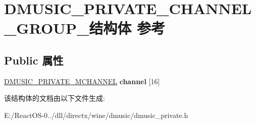 \hypertarget{struct_d_m_u_s_i_c___p_r_i_v_a_t_e___c_h_a_n_n_e_l___g_r_o_u_p__}{}\section{D\+M\+U\+S\+I\+C\+\_\+\+P\+R\+I\+V\+A\+T\+E\+\_\+\+C\+H\+A\+N\+N\+E\+L\+\_\+\+G\+R\+O\+U\+P\+\_\+结构体 参考}
\label{struct_d_m_u_s_i_c___p_r_i_v_a_t_e___c_h_a_n_n_e_l___g_r_o_u_p__}
\subsection*{Public 属性}
\begin{DoxyCompactItemize}
\item 
\mbox{\label{struct_d_m_u_s_i_c___p_r_i_v_a_t_e___c_h_a_n_n_e_l___g_r_o_u_p___aed6107b3f0b37628958eb0b15da1d7e4}} 
\hyperlink{struct_d_m_u_s_i_c___p_r_i_v_a_t_e___m_c_h_a_n_n_e_l__}{D\+M\+U\+S\+I\+C\+\_\+\+P\+R\+I\+V\+A\+T\+E\+\_\+\+M\+C\+H\+A\+N\+N\+EL} {\bfseries channel} \mbox{[}16\mbox{]}
\end{DoxyCompactItemize}


该结构体的文档由以下文件生成\+:\begin{DoxyCompactItemize}
\item 
E\+:/\+React\+O\+S-\/0../dll/directx/wine/dmusic/dmusic\+\_\+private.\+h\end{DoxyCompactItemize}
